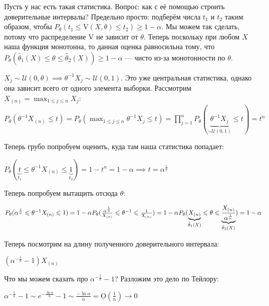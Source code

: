 \begin{enumerate}
    Пусть у нас есть такая статистика. Вопрос: как с её помощью строить доверительные интервалы?
    Предельно просто: подберём числа $t_1$ и $t_2$ таким образом, чтобы
    $P_\theta(t_1 \leq \text{V}(X, \theta) \leq t_2) \geq 1 - \alpha$. Мы можем так сделать,
    потому что распределение V не зависит от $\theta$. Теперь поскольку при любом $X$
    наша функция монотонна, то данная оценка равносильна тому, что $P_\theta(\hat{\theta}_1(X) \leq
    \theta \leq \hat{\theta}_2(X)) \geq 1 - \alpha$ --- чисто из-за монотонности по $\theta$.

    \begin{example}
        $
        X_j \sim \mathcal{U}(0, \theta) \implies \theta^{-1}X_j \sim \mathcal{U}(0, 1)
        $. Это уже центральная статистика, однако она зависит всего от одного элемента выборки.
        Рассмотрим $X_{(n)} = \max_{1 \leq j \leq n}X_j$:
        $P_\theta(\theta^{-1} X_{(n)} \leq t) = P_\theta(\max_{1 \leq j \leq n}\theta^{-1}X_j \leq t)
        = \prod_{j = 1}^n P_\theta(\underbrace{\theta^{-1}X_j}_{\sim \mathcal{U}(0, 1)} \leq t) = t^n
        $

        Теперь грубо попробуем оценить, куда там наша статистика попадает:

        $
            P_\theta(\underbrace{t}_{t_1} \leq \theta^{-1}X_{(n)} \leq \underbrace{1}_{t_2}) = 
            1 - t^n = 1 - \alpha \implies t = \alpha^{\frac{1}{n}}
        $

        Теперь попробуем вытащить отсюда $\theta$:

        $
            P_\theta(\alpha^{\frac{1}{n}} \leq \theta^{-1}X_{(n)} \leq 1) = 1 - \alpha
            \\
            P_\theta(\frac{\alpha^{\frac{1}{n}}}{X_{(n)}} \leq \theta^{-1} \leq \frac{1}{X_{(n)}}) = 1 - \alpha
            \\
            P_\theta(\underbrace{X_{(n)}}_{\hat{\theta}_1(X)} \leq \theta \leq 
            \underbrace{\frac{X_{(n)}}{\alpha^{\frac{1}{n}}}}_{\hat{\theta}_2(X)}) = 1 - \alpha
        $

        Теперь посмотрим на длину полученного доверительного интервала:

        $
            (\alpha^{-\frac{1}{n}} - 1)X_{(n)}
        $
        
        Что мы можем сказать про $\alpha^{-\frac{1}{n}} - 1$? Разложим это дело по Тейлору:
        
        $
            \alpha^{-\frac{1}{n}} - 1 \sim e^{-\frac{\ln \alpha}{n}} - 1 \sim \frac{-\ln{\alpha}}{n} = 
            \underline{\text{O}}(\frac{1}{n}) \to 0
        $


\end{example}
\end{enumerate}
